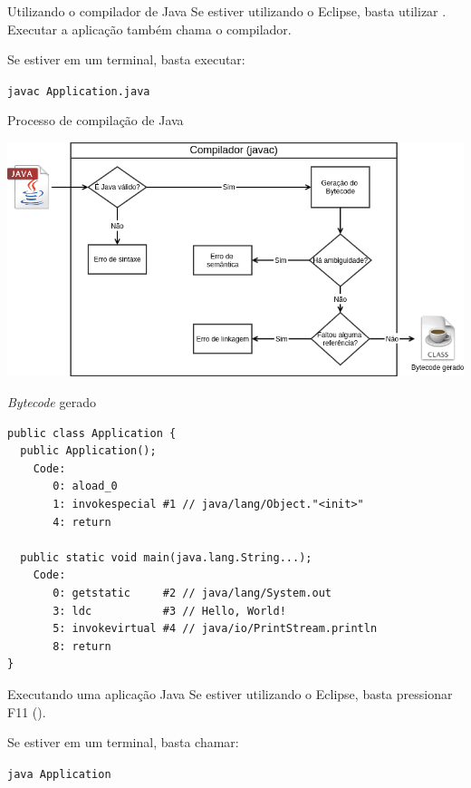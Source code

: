 \documentclass{beamer}
\newcommand{\icon}[1]{\raisebox{-.2\height}{\texttt{[image: \#1]}}}
\begin{document}
\begin{frame}{Utilizando o compilador de Java}
    Se estiver utilizando o Eclipse, basta utilizar . Executar a aplicação também chama o compilador.

    Se estiver em um terminal, basta executar:

    \texttt{javac Application.java}
\end{frame}


\begin{frame}{Processo de compilação de Java}
    \begin{center}
        \includegraphics[keepaspectratio,width=1\textwidth,height=1\textheight]{compilation_scheme}
    \end{center}
\end{frame}


\begin{frame}[fragile]{\textit{Bytecode} gerado}
    \begin{verbatim}
public class Application {
  public Application();
    Code:
       0: aload_0
       1: invokespecial #1 // java/lang/Object."<init>"
       4: return

  public static void main(java.lang.String...);
    Code:
       0: getstatic     #2 // java/lang/System.out
       3: ldc           #3 // Hello, World!
       5: invokevirtual #4 // java/io/PrintStream.println
       8: return
}
    \end{verbatim}
\end{frame}


\begin{frame}{Executando uma aplicação Java}
    Se estiver utilizando o Eclipse, basta pressionar F11 (\menu{\icon{eclipse_run} Run}).

    Se estiver em um terminal, basta chamar:

    \texttt{java Application}
\end{frame}
\end{document}
